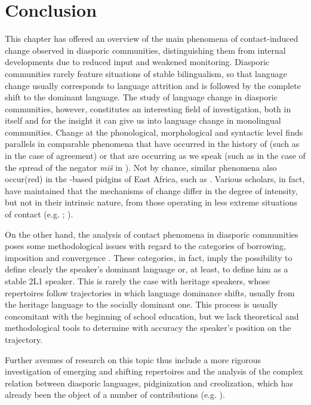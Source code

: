 \documentclass[output=paper]{langsci/langscibook}
\begin{document}
\section{Conclusion}

This chapter has offered an overview of the main phenomena of contact-induced change observed in  diasporic communities, distinguishing them from internal developments due to reduced input and weakened monitoring. Diasporic communities rarely feature situations of stable {bilingualism}, so that {language change} usually corresponds to language attrition and is followed by the complete shift to the dominant language. The study of {language change} in diasporic communities, however, constitutes an interesting field of investigation, both in itself and for the insight it can give us into {language change} in {monolingual} communities. Change at the phonological, morphological and syntactic level finds parallels in comparable phenomena that have occurred in the history of  (such as in the case of {agreement}) or that are occurring as we speak (such as in the case of the spread of the negator \textit{miš} in ). Not by chance, similar phenomena also occur(red) in the -based pidgins of East Africa, such as  . Various scholars, in fact, have maintained that the mechanisms of change differ in the degree of intensity, but not in their intrinsic nature, from those operating in less extreme situations of contact (e.g. \citealt[8]{Miller2003}; \citealt[528]{Lucas2015}).

On the other hand, the analysis of contact phenomena in diasporic communities poses some methodological issues with regard to the categories of borrowing, {imposition} and {convergence} \citep{VanCoetsem1988,VanCoetsem2000}. These categories, in fact, imply the possibility to define clearly the speaker’s dominant language or, at least, to define him as a stable 2L1 speaker. This is rarely the case with {heritage speakers}, whose repertoires follow trajectories in which language dominance shifts, usually from the heritage language to the socially dominant one. This process is usually concomitant with the beginning of school education, but we lack theoretical and methodological tools to determine with accuracy the speaker’s position on the trajectory.

Further avenues of research on this topic thus include a more rigorous investigation of emerging and shifting repertoires and the analysis of the complex relation between diasporic languages, pidginization and creolization, which has already been the object of a number of contributions (e.g. \citealt{GonzoSaltarelli1983,Romaine1989}).
\end{document}
